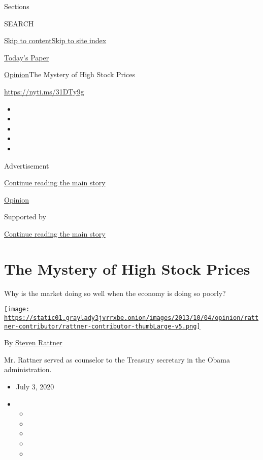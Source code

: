 Sections

SEARCH

\protect\hyperlink{site-content}{Skip to
content}\protect\hyperlink{site-index}{Skip to site index}

\href{https://myaccount.nytimes3xbfgragh.onion/auth/login?response_type=cookie\&client_id=vi}{}

\href{https://www.nytimes3xbfgragh.onion/section/todayspaper}{Today's
Paper}

\href{/section/opinion}{Opinion}\textbar{}The Mystery of High Stock
Prices

\url{https://nyti.ms/31DTy9g}

\begin{itemize}
\item
\item
\item
\item
\item
\end{itemize}

Advertisement

\protect\hyperlink{after-top}{Continue reading the main story}

\href{/section/opinion}{Opinion}

Supported by

\protect\hyperlink{after-sponsor}{Continue reading the main story}

\hypertarget{the-mystery-of-high-stock-prices}{%
\section{The Mystery of High Stock
Prices}\label{the-mystery-of-high-stock-prices}}

Why is the market doing so well when the economy is doing so poorly?

\href{https://www.nytimes3xbfgragh.onion/topic/person/steven-rattner}{\texttt{[image: https://static01.graylady3jvrrxbe.onion/images/2013/10/04/opinion/rattner-contributor/rattner-contributor-thumbLarge-v5.png]}}

By
\href{https://www.nytimes3xbfgragh.onion/topic/person/steven-rattner}{Steven
Rattner}

Mr. Rattner served as counselor to the Treasury secretary in the Obama
administration.

\begin{itemize}
\item
  July 3, 2020
\item
  \begin{itemize}
  \item
  \item
  \item
  \item
  \item
  \end{itemize}
\end{itemize}


